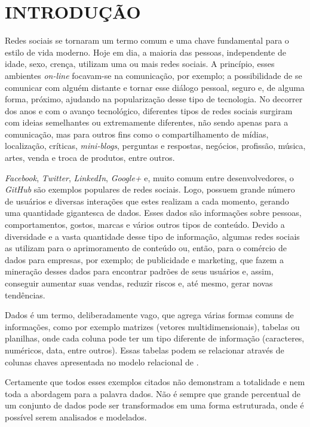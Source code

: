 \chapter{INTRODUÇÃO}\label{ch:introducao}

Redes sociais se tornaram um termo comum e uma chave fundamental para o estilo de vida moderno. Hoje em dia, a maioria das pessoas, independente de idade, sexo, crença, utilizam uma ou mais redes sociais. A princípio, esses ambientes \textit{on-line} focavam-se na comunicação, por exemplo; a possibilidade de se comunicar com alguém distante e tornar esse diálogo pessoal, seguro e, de alguma forma, próximo, ajudando na popularização desse tipo de tecnologia. No decorrer dos anos e com o avanço tecnológico, diferentes tipos de redes sociais surgiram com ideias semelhantes ou extremamente diferentes, não sendo apenas para a comunicação, mas para outros fins como o compartilhamento de mídias, localização, críticas, \textit{mini-blogs}, perguntas e respostas, negócios, profissão, música, artes, venda e troca de produtos, entre outros.

\textit{Facebook}, \textit{Twitter}, \textit{LinkedIn}, \textit{Google+} e, muito comum entre desenvolvedores, o \textit{GitHub} são exemplos populares de redes sociais. Logo, possuem grande número de usuários e diversas interações que estes realizam a cada momento, gerando uma quantidade gigantesca de dados. Esses dados são informações sobre pessoas, comportamentos, gostos, marcas e vários outros tipos de conteúdo. Devido a diversidade e a vasta quantidade desse tipo de informação, algumas redes sociais as utilizam para o aprimoramento de conteúdo ou, então, para o comércio de dados para empresas, por exemplo; de publicidade e marketing, que fazem a mineração desses dados para encontrar padrões de seus usuários e, assim, conseguir aumentar suas vendas, reduzir riscos e, até mesmo, gerar novas tendências.

Dados é um termo, deliberadamente vago, que agrega várias formas comuns de informações, como por exemplo matrizes (vetores multidimensionais), tabelas ou planilhas, onde cada coluna pode ter um tipo diferente de informação (caracteres, numéricos, data, entre outros). Essas tabelas podem se relacionar através de colunas chaves apresentada no modelo relacional de .

Certamente que todos esses exemplos citados não demonstram a totalidade e nem toda a abordagem para a palavra dados. Não é sempre que grande percentual de um conjunto de dados pode ser transformados em uma forma estruturada, onde é possível serem analisados e modelados.

